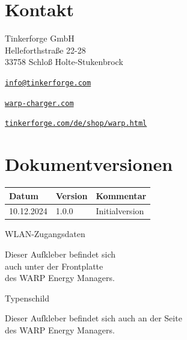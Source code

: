 \documentclass[a4paper,10pt]{article}
\begin{document}
\begin{multicols*}{2}
    \section{Kontakt}
    Tinkerforge GmbH\\ Helleforthstraße 22-28\\ 33758 Schloß Holte-Stukenbrock
    \begin{description}[leftmargin=!,labelwidth=\widthof{\textbf{Website}}]
        \item[E-Mail] \href{mailto:info@tinkerforge.com}{\texttt{info@tinkerforge.com}}
        \item[Website] \href{https://warp-charger.com}{\texttt{warp-charger.com}}
        \item[Telefon] 
        \item[Shop] \href{https://tinkerforge.com/de/shop/warp.html}{\texttt{tinkerforge.com/de/shop/warp.html}}
    \end{description}

	\section{Dokumentversionen}
	\begin{tabular}{lll}
		\toprule
		Datum      & Version & Kommentar                       \\
		\midrule
		10.12.2024 & 1.0.0   & Initialversion                  \\
		\bottomrule
	\end{tabular}

	\vfill
	\null
	\newpage

	\columnbreak

    \end{multicols*}

    \appendix

	\newpage
	\pagecolor{covergray}\afterpage{\nopagecolor}

   \begin{multicols*}{2}
    \pagestyle{empty}
    \null
    \vfill
	\color{white}
    WLAN-Zugangsdaten
    \begin{tcolorbox}[width=4.2cm,height=2.7cm, boxrule=0.25mm]

    \end{tcolorbox}
	Dieser Aufkleber befindet sich\\ auch unter der Frontplatte\\des WARP Energy
	Managers.
    \columnbreak

    \null
    \vfill
    Typenschild
    \begin{tcolorbox}[width=7.8cm,height=4.1cm, boxrule=0.25mm]

    \end{tcolorbox}
    Dieser Aufkleber befindet sich auch an der Seite\\ des WARP Energy Managers.
\end{multicols*}
\end{document}
